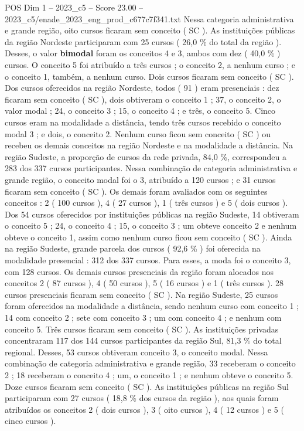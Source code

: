 \begin{textsample}{POS Dim 1 – 2023\_c5 – Score 23.00 – 2023\_c5/enade\_2023\_eng\_prod\_c677c7f341.txt}
Nessa categoria administrativa e grande região, oito cursos ficaram sem conceito ( SC ).
As instituições públicas da região Nordeste participaram com 25 cursos ( 26,0 \% do total da região ).
Desses, o valor \textbf{bimodal} foram os conceitos 4 e 3, ambos com dez ( 40,0 \% ) cursos.
O conceito 5 foi atribuído a três cursos ; o conceito 2, a nenhum curso ; e o conceito 1, também, a nenhum curso.
Dois cursos ficaram sem conceito ( SC ).
Dos cursos oferecidos na região Nordeste, todos ( 91 ) eram presenciais : dez ficaram sem conceito ( SC ), dois obtiveram o conceito 1 ; 37, o conceito 2, o valor modal ; 24, o conceito 3 ; 15, o conceito 4 ; e três, o conceito 5.
Cinco cursos eram na modalidade a distância, tendo três cursos recebido o conceito modal 3 ; e dois, o conceito 2.
Nenhum curso ficou sem conceito ( SC ) ou recebeu os demais conceitos na região Nordeste e na modalidade a distância.
Na região Sudeste, a proporção de cursos da rede privada, 84,0 \%, correspondeu a 283 dos 337 cursos participantes.
Nessa combinação de categoria administrativa e grande região, o conceito modal foi o 3, atribuído a 120 cursos ; e 31 cursos ficaram sem conceito ( SC ).
Os demais foram avaliados com os seguintes conceitos : 2 ( 100 cursos ), 4 ( 27 cursos ), 1 ( três cursos ) e 5 ( dois cursos ).
Dos 54 cursos oferecidos por instituições públicas na região Sudeste, 14 obtiveram o conceito 5 ; 24, o conceito 4 ; 15, o conceito 3 ; um obteve conceito 2 e nenhum obteve o conceito 1, assim como nenhum curso ficou sem conceito ( SC ).
Ainda na região Sudeste, grande parcela dos cursos ( 92,6 \% ) foi oferecida na modalidade presencial : 312 dos 337 cursos.
Para esses, a moda foi o conceito 3, com 128 cursos.
Os demais cursos presenciais da região foram alocados nos conceitos 2 ( 87 cursos ), 4 ( 50 cursos ), 5 ( 16 cursos ) e 1 ( três cursos ). 28 cursos presenciais ficaram sem conceito ( SC ).
Na região Sudeste, 25 cursos foram oferecidos na modalidade a distância, sendo nenhum curso com conceito 1 ; 14 com conceito 2 ; sete com conceito 3 ; um com conceito 4 ; e nenhum com conceito 5.
Três cursos ficaram sem conceito ( SC ).
As instituições privadas concentraram 117 dos 144 cursos participantes da região Sul, 81,3 \% do total regional.
Desses, 53 cursos obtiveram conceito 3, o conceito modal.
Nessa combinação de categoria administrativa e grande região, 33 receberam o conceito 2 ; 18 receberam o conceito 4 ; um, o conceito 1 ; e nenhum obteve o conceito 5.
Doze cursos ficaram sem conceito ( SC ).
As instituições públicas na região Sul participaram com 27 cursos ( 18,8 \% dos cursos da região ), aos quais foram atribuídos os conceitos 2 ( dois cursos ), 3 ( oito cursos ), 4 ( 12 cursos ) e 5 ( cinco cursos ).

\end{textsample}
